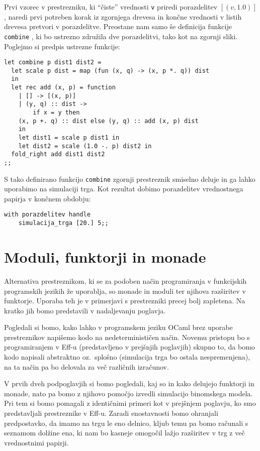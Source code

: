 \documentclass[a4paper,12pt]{article}
\theoremstyle{definition} %
\begin{document}
Prvi vzorec v prestrezniku, ki  "`čiste"' vrednosti \lstinline{v} priredi porazdelitev $[(v, 1.0)]$, naredi prvi potreben korak iz zgornjega drevesa in končne vrednosti v listih drevesa pretvori v porazdelitve. Preostane nam samo še definicija funkcije \lstinline{combine} \cite{examples}, ki bo ustrezno združila dve porazdelitvi, tako kot na zgornji sliki. Poglejmo si predpis ustrezne funkcije:
\begin{lstlisting}
let combine p dist1 dist2 =
  let scale p dist = map (fun (x, q) -> (x, p *. q)) dist 
  in
  let rec add (x, p) = function
    | [] -> [(x, p)]
    | (y, q) :: dist ->
        if x = y then 
	(x, p +. q) :: dist else (y, q) :: add (x, p) dist
    in
    let dist1 = scale p dist1 in
    let dist2 = scale (1.0 -. p) dist2 in
  fold_right add dist1 dist2
;;
\end{lstlisting}
S tako definirano funkcijo \lstinline{combine} zgornji prestreznik smiselno deluje in ga lahko uporabimo na simulaciji trga. Kot rezultat dobimo porazdelitev vrednostnega papirja v končnem obdobju:
\begin{lstlisting}
with porazdelitev handle
    simulacija_trga [20.] 5;;
\end{lstlisting}

\section{Moduli, funktorji in monade}

Alternativa prestreznikom, ki se za podoben način programiranja v funkcijskih programskih jezikih že uporablja, so monade in moduli ter njihova razširitev v funktorje. Uporaba teh je v primerjavi s prestrezniki precej bolj zapletena. Na kratko jih bomo predstavili v nadaljevanju poglavja.

Pogledali si bomo, kako lahko v programskem jeziku OCaml brez uporabe prestreznikov napišemo kodo na nedeterminističen način. Novemu pristopu bo s programiranjem v Eff-u (predstavljeno v prejšnjih poglavjih) skupno to, da bomo kodo napisali  abstraktno oz.\ splošno (simulacija trga bo ostala nespremenjena), na ta način pa bo delovala za več različnih izračunov.

V prvih dveh podpoglavjih si bomo pogledali, kaj so in kako delujejo funktorji in monade, nato pa bomo z njihovo pomočjo izvedli simulacijo binomskega modela. Pri tem si bomo pomagali z identičnimi primeri kot v prejšnjem poglavju, ko smo predstavljali prestreznike v Eff-u. Zaradi enostavnosti bomo ohranjali predpostavko, da imamo na trgu le eno delnico, kljub temu pa bomo računali s seznamom dolžine ena, ki nam bo kasneje omogočil lažjo razširitev v trg z več vrednostnimi papirji.
\end{document}
